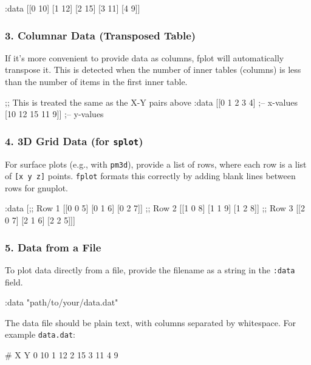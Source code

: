 \documentclass[12pt, letterpaper]{article}
\begin{document}
	\begin{fennelcode}
:data [[0 10] [1 12] [2 15] [3 11] [4 9]]
	\end{fennelcode}
	
	\subsubsection*{3. Columnar Data (Transposed Table)}
	
	If it's more convenient to provide data as columns, fplot will automatically transpose it. This is detected when the number of inner tables (columns) is less than the number of items in the first inner table.
	
	\begin{fennelcode}
;; This is treated the same as the X-Y pairs above
:data [[0 1 2 3 4]      ;-- x-values
[10 12 15 11 9]]  ;-- y-values
	\end{fennelcode}
	
	\subsubsection*{4. 3D Grid Data (for \texttt{splot})}
	
	For surface plots (e.g., with \texttt{pm3d}), provide a list of rows, where each row is a list of \texttt{[x y z]} points. \texttt{fplot} formats this correctly by adding blank lines between rows for gnuplot.
	
	\begin{fennelcode}
:data [;; Row 1
[[0 0 5] [0 1 6] [0 2 7]]
;; Row 2
[[1 0 8] [1 1 9] [1 2 8]]
;; Row 3
[[2 0 7] [2 1 6] [2 2 5]]]
	\end{fennelcode}
	
	\subsubsection*{5. Data from a File}
	
	To plot data directly from a file, provide the filename as a string in the \texttt{:data} field.
	
	\begin{fennelcode}
:data "path/to/your/data.dat"
	\end{fennelcode}
	
	The data file should be plain text, with columns separated by whitespace. For example \texttt{data.dat}:
	
	\begin{bashcode}
# X Y
0  10
1  12
2  15
3  11
4  9
	\end{bashcode}
	
\end{document}
